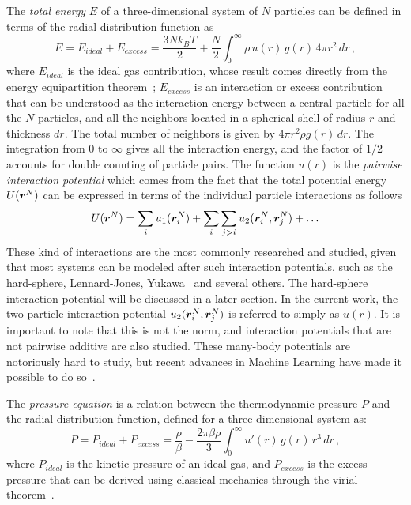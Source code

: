 The \emph{total energy} $E$ of a three-dimensional system of $N$ particles can be defined 
in terms of the radial distribution function as
\begin{equation}
    E = E_{ideal} + E_{excess} = \frac{3 N k_{B} T}{2} +
    \frac{N}{2} \int_{0}^{\infty} \rho \, u(r) \, g(r) \, 4 \pi r^2 \, dr
    \, ,
    \label{eq:total-energy-rdf}
\end{equation}
where $E_{ideal}$ is the ideal gas contribution, whose result comes directly from
the energy equipartition theorem~\cite{mcquarrieStatisticalMechanics2000};
$E_{excess}$ is an interaction or excess contribution that can be understood
as the interaction energy between a central particle for all the $N$ particles,
and all the neighbors located in a spherical shell of radius $r$ and thickness
$dr$. The total number of neighbors is given by $4 \pi r^2 \rho g(r) \, dr$.
The integration from $0$ to $\infty$ gives all the interaction energy, and
the factor of $1/2$ accounts for double counting of particle pairs.
The function $u(r)$ is the \emph{pairwise interaction potential} which comes
from the fact that the total potential energy $U(\bm{r}^{N})$ can be expressed
in terms of the individual particle interactions as follows
\begin{equation}
    U(\vecr^{N}) = \sum_{i} u_{1} (\vecr_{i}^{N}) +
    \sum_{i} \sum_{j>i} u_{2} (\vecr_{i}^{N}, \vecr_{j}^{N}) +
    \dots
    \label{eq:pairwise-energy}
\end{equation}
These kind of interactions are the most commonly researched and studied, given that most
systems can be modeled after such interaction potentials, such as the
hard-sphere, Lennard-Jones, Yukawa~\cite{huangStatisticalMechanics1987}
and several others. The hard-sphere interaction potential will be discussed
in a later section.
In the current work, the two-particle interaction potential
$u_{2} (\bm{r}_{i}^{N}, \bm{r}_{j}^{N})$ is referred to simply as $u(r)$.
It is important to note that this is not the norm, and interaction potentials
that are not pairwise additive are also studied. These many-body potentials are
notoriously hard to study, but recent advances in Machine Learning have made it
possible to do so~\cite{boattiniModelingManybodyInteractions2020}.

The \emph{pressure equation} is a relation between the thermodynamic pressure
$P$ and the radial distribution function, defined for a three-dimensional system as:
\begin{equation}
    P=P_{ideal}+P_{excess}= \frac{\rho}{\beta} - \frac{2 \pi \beta \rho}{3}
    \int_{0}^{\infty} u'(r) \, g(r) \, r^3 \, dr \, ,
    \label{eq:pressure-equation}
\end{equation}
where $P_{ideal}$ is the kinetic pressure of an ideal gas, and $P_{excess}$
is the excess pressure that can be derived using classical mechanics through the
virial theorem~\cite{goldsteinClassicalMechanics2002}.

